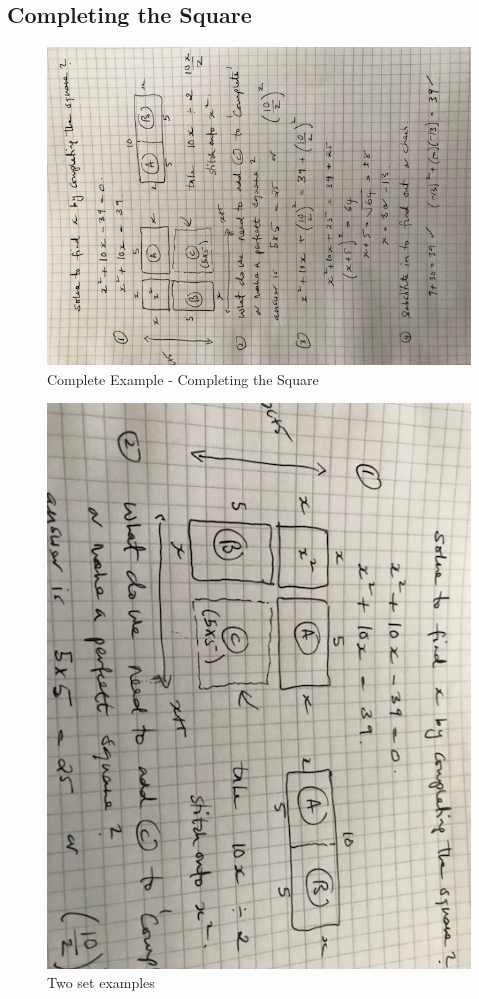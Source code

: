 \subsection{Completing the Square}


\begin{figure}[h]
    \centering
    \includegraphics[width=1.25\textwidth]{IMG_3049}
    \caption{Complete Example - Completing the Square}
    \label{fig:example1}
\end{figure}

\begin{figure}[h]
    \centering
    \includegraphics[width=1.25\textwidth]{IMG_3050}
    \caption{Two set examples}
    \label{fig:example1}
\end{figure}
